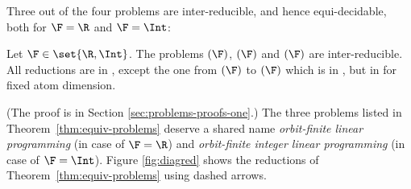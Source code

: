 Three out of the four problems are inter-reducible, and hence equi-decidable,
both for $\F = \R$ and $\F = \Int$:
%
\begin{theorem} \label{thm:equiv-problems}
Let $\F\in\set{\R,\Int}$. 
The problems \ineqsolvname$(\F)$, \finineqsolvname$(\F)$ and \nonnegsolvname$(\F)$ are inter-reducible. 
All reductions are in \PTIME, except the one from \ineqsolvname$(\F)$ to \finineqsolvname$(\F)$ 
which is in \EXPTIME, but in \PTIME for fixed atom dimension.
\end{theorem}
%
%
(The proof is in Section \ref{sec:problems-proofs-one}.)
The three problems listed in Theorem~\ref{thm:equiv-problems} deserve a shared name \emph{orbit-finite linear programming} 
(in case of $\F=\R$) and \emph{orbit-finite integer linear programming} (in case of $\F=\Int$).
Figure \ref{fig:diagred} shows the reductions of Theorem~\ref{thm:equiv-problems} using dashed arrows.
%
%


